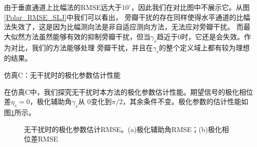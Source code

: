 \documentclass[master]{thesis-uestc}
\begin{document}
由于垂直通道上比幅法的RMSE远大于$10^\circ$，因此我们在对比图中不展示它。从图\ref{Polar_RMSE_SLJ}中我们可以看出，
旁瓣干扰的存在同样使得水平通道的比幅法失效了，这是因为比幅测向法是非自适应测向方法，无法应对旁瓣干扰。
而最大似然方法虽然能够有效的抑制旁瓣干扰，但当$\gamma_s$趋近于0时，它还是会失效。作为对比，我们的方法能够处理
旁瓣干扰，并且在$\gamma_s$的整个定义域上都有较为理想的结果。

仿真C：无干扰时的极化参数估计性能

在仿真C中，我们探究无干扰时本方法的极化参数估计性能。期望信号的极化相位差$\eta_s=0$，极化辅助角$\gamma_s$从
$0$变化到$\pi/2$，其余条件不变。极化参数的估计性能如图\ref{Polar_args_RMSE}所示。
\begin{figure}[h]
    \caption{无干扰时的极化参数估计RMSE。(a)极化辅助角RMSE；(b)极化相位差RMSE}
    \label{Polar_args_RMSE}
\end{figure}
\end{document}
